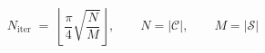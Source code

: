 \begin{equation}
N_{\mathrm{iter}} \; = \; \left\lfloor \frac{\pi}{4} \sqrt{\frac{N}{M}} \right\rfloor, \qquad N = |\mathcal{C}|, \qquad M = |\mathcal{S}|
\end{equation}
